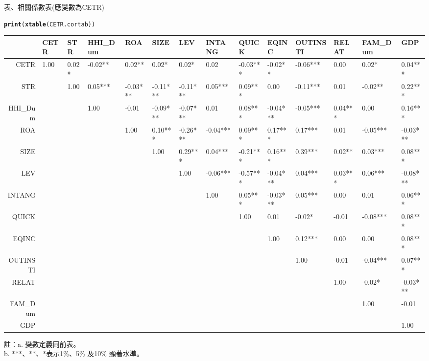 \documentclass[a4paper]{article}\usepackage[]{graphicx}\usepackage[]{color}
\makeatletter
\newcommand{\hlstd}[1]{\textcolor[rgb]{0.345,0.345,0.345}{#1}}%
\newcommand{\hlkwd}[1]{\textcolor[rgb]{0.737,0.353,0.396}{\textbf{#1}}}%
\newenvironment{kframe}{%
 \def\at@end@of@kframe{}%
 \ifinner\ifhmode%
  \def\at@end@of@kframe{\end{minipage}}%
  \begin{minipage}{\columnwidth}%
 \fi\fi%
 \def\FrameCommand##1{\hskip\@totalleftmargin \hskip-\fboxsep
 \colorbox{shadecolor}{##1}\hskip-\fboxsep
     \hskip-\linewidth \hskip-\@totalleftmargin \hskip\columnwidth}%
 \MakeFramed {\advance\hsize-\width
   \@totalleftmargin\z@ \linewidth\hsize
   \@setminipage}}%
 {\par\unskip\endMakeFramed%
 \at@end@of@kframe}
\makeatother
\begin{document}
\newpage
\begin{landscape}
\thispagestyle{empty}
\centerline{表、相關係數表(應變數為CETR)}
\begin{kframe}
\begin{alltt}
\hlkwd{print}\hlstd{(}\hlkwd{xtable}\hlstd{(CETR.cortab))}
\end{alltt}
\end{kframe}%
\begin{table}[ht]
\centering
\begin{tabular}{rlllllllllllll}
  \hline
 & CETR & STR & HHI\_Dum & ROA & SIZE & LEV & INTANG & QUICK & EQINC & OUTINSTI & RELAT & FAM\_Dum & GDP \\ 
  \hline
CETR &  1.00  &  0.02*   & -0.02**  &  0.02**  &  0.02*   &  0.02*   &  0.02    & -0.03*** & -0.02**  & -0.06*** &  0.00    &  0.02*   &  0.04*** \\ 
  STR &  &  1.00  &  0.05*** & -0.03*** & -0.11*** & -0.11*** &  0.05*** &  0.09*** &  0.00    & -0.11*** &  0.01    & -0.02**  &  0.22*** \\ 
  HHI\_Dum &  &  &  1.00  & -0.01    & -0.09*** & -0.07*** &  0.01    &  0.08*** & -0.04*** & -0.05*** &  0.04*** &  0.00    &  0.16*** \\ 
  ROA &  &  &  &  1.00  &  0.10*** & -0.26*** & -0.04*** &  0.09*** &  0.17*** &  0.17*** &  0.01    & -0.05*** & -0.03*** \\ 
  SIZE &  &  &  &  &  1.00  &  0.29*** &  0.04*** & -0.21*** &  0.16*** &  0.39*** &  0.02**  &  0.03*** &  0.08*** \\ 
  LEV &  &  &  &  &  &  1.00  & -0.06*** & -0.57*** & -0.04*** &  0.04*** &  0.03*** &  0.06*** & -0.08*** \\ 
  INTANG &  &  &  &  &  &  &  1.00  &  0.05*** & -0.03*** &  0.05*** &  0.00    &  0.01    &  0.06*** \\ 
  QUICK &  &  &  &  &  &  &  &  1.00  &  0.01    & -0.02*   & -0.01    & -0.08*** &  0.08*** \\ 
  EQINC &  &  &  &  &  &  &  &  &  1.00  &  0.12*** &  0.00    &  0.00    &  0.08*** \\ 
  OUTINSTI &  &  &  &  &  &  &  &  &  &  1.00  & -0.01    & -0.04*** &  0.07*** \\ 
  RELAT &  &  &  &  &  &  &  &  &  &  &  1.00  & -0.02*   & -0.03*** \\ 
  FAM\_Dum &  &  &  &  &  &  &  &  &  &  &  &  1.00  & -0.01    \\ 
  GDP &  &  &  &  &  &  &  &  &  &  &  &  &  1.00  \\ 
   \hline
\end{tabular}
\end{table}

註：a. 變數定義同前表。\\
    b. ***、**、*表示1\%、5\% 及10\% 顯著水準。\\
\end{landscape}
\end{document}
